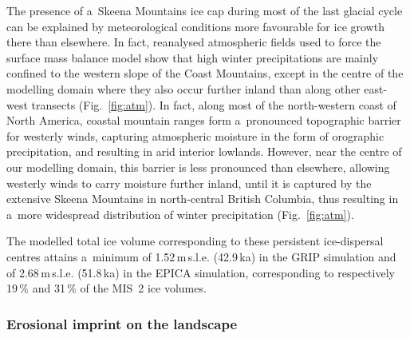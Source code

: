 \documentclass[tc, manuscript]{copernicus}
\begin{document}
      The presence of a~Skeena Mountains ice cap during most of the last
      glacial cycle can be explained by meteorological conditions more
      favourable for ice growth there than elsewhere. In fact, reanalysed
      atmospheric fields used to force the surface mass balance model show
      that high winter precipitations are mainly confined to the western
      slope of the Coast Mountains, except in the centre of the modelling
      domain where they also occur further inland than along other east-west
      transects (Fig.~\ref{fig:atm}). In fact, along most of the
      north-western coast of North America, coastal mountain ranges form
      a~pronounced topographic barrier for westerly winds, capturing
      atmospheric moisture in the form of orographic precipitation, and
      resulting in arid interior lowlands. However, near the centre of our
      modelling domain, this barrier is less pronounced than elsewhere,
      allowing westerly winds to carry moisture further inland, until it is
      captured by the extensive Skeena Mountains in north-central British
      Columbia, thus resulting in a~more widespread distribution of winter
      precipitation (Fig.~\ref{fig:atm}).

      The modelled total ice volume corresponding to these persistent
      ice-dispersal centres attains a~minimum of 1.52\,\unit{m}\,s.l.e.
      (42.9\,\unit{ka}) in the GRIP simulation and of 2.68\,\unit{m}\,s.l.e.
      (51.8\,\unit{ka}) in the EPICA simulation, corresponding to
      respectively 19\,\% and 31\,\% of the MIS~2 ice volumes.

\subsubsection{Erosional imprint on the landscape}
\end{document}
